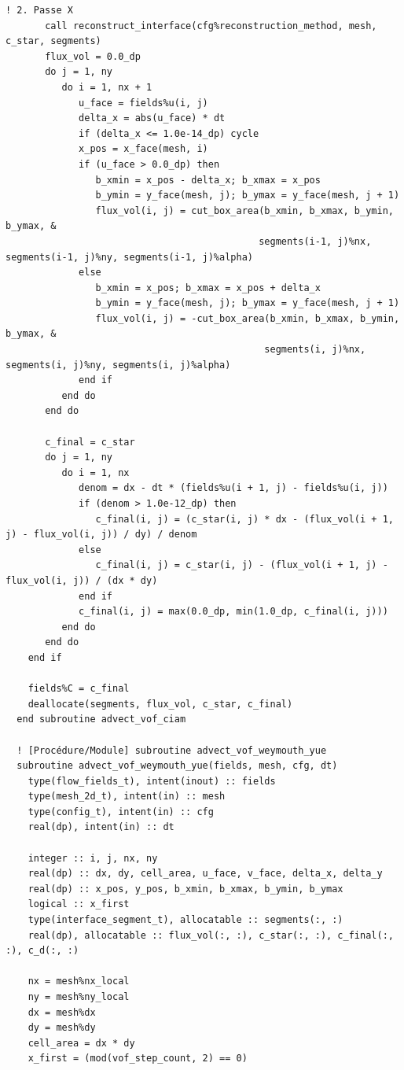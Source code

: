 \documentclass[10pt,a4paper,oneside]{book}
\begin{document}
\begin{lstlisting}[language={[95]Fortran}]
       ! 2. Passe X
       call reconstruct_interface(cfg%reconstruction_method, mesh, c_star, segments)
       flux_vol = 0.0_dp
       do j = 1, ny
          do i = 1, nx + 1
             u_face = fields%u(i, j)
             delta_x = abs(u_face) * dt
             if (delta_x <= 1.0e-14_dp) cycle
             x_pos = x_face(mesh, i)
             if (u_face > 0.0_dp) then
                b_xmin = x_pos - delta_x; b_xmax = x_pos
                b_ymin = y_face(mesh, j); b_ymax = y_face(mesh, j + 1)
                flux_vol(i, j) = cut_box_area(b_xmin, b_xmax, b_ymin, b_ymax, &
                                             segments(i-1, j)%nx, segments(i-1, j)%ny, segments(i-1, j)%alpha)
             else
                b_xmin = x_pos; b_xmax = x_pos + delta_x
                b_ymin = y_face(mesh, j); b_ymax = y_face(mesh, j + 1)
                flux_vol(i, j) = -cut_box_area(b_xmin, b_xmax, b_ymin, b_ymax, &
                                              segments(i, j)%nx, segments(i, j)%ny, segments(i, j)%alpha)
             end if
          end do
       end do

       c_final = c_star
       do j = 1, ny
          do i = 1, nx
             denom = dx - dt * (fields%u(i + 1, j) - fields%u(i, j))
             if (denom > 1.0e-12_dp) then
                c_final(i, j) = (c_star(i, j) * dx - (flux_vol(i + 1, j) - flux_vol(i, j)) / dy) / denom
             else
                c_final(i, j) = c_star(i, j) - (flux_vol(i + 1, j) - flux_vol(i, j)) / (dx * dy)
             end if
             c_final(i, j) = max(0.0_dp, min(1.0_dp, c_final(i, j)))
          end do
       end do
    end if

    fields%C = c_final
    deallocate(segments, flux_vol, c_star, c_final)
  end subroutine advect_vof_ciam

  ! [Procédure/Module] subroutine advect_vof_weymouth_yue
  subroutine advect_vof_weymouth_yue(fields, mesh, cfg, dt)
    type(flow_fields_t), intent(inout) :: fields
    type(mesh_2d_t), intent(in) :: mesh
    type(config_t), intent(in) :: cfg
    real(dp), intent(in) :: dt

    integer :: i, j, nx, ny
    real(dp) :: dx, dy, cell_area, u_face, v_face, delta_x, delta_y
    real(dp) :: x_pos, y_pos, b_xmin, b_xmax, b_ymin, b_ymax
    logical :: x_first
    type(interface_segment_t), allocatable :: segments(:, :)
    real(dp), allocatable :: flux_vol(:, :), c_star(:, :), c_final(:, :), c_d(:, :)

    nx = mesh%nx_local
    ny = mesh%ny_local
    dx = mesh%dx
    dy = mesh%dy
    cell_area = dx * dy
    x_first = (mod(vof_step_count, 2) == 0)


\end{lstlisting}
\end{document}

